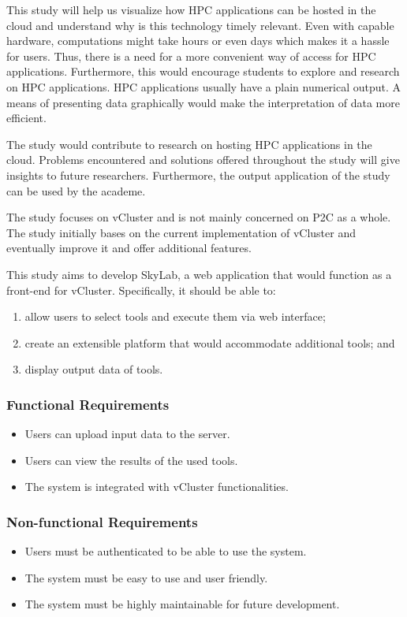     This study will help us visualize how HPC applications can be hosted in the cloud and understand why is this technology timely relevant.  Even with capable hardware, computations might take hours or even days which makes it a hassle for users. Thus, there is a need for a more convenient way of access for HPC applications. Furthermore, this would encourage students to explore and research on HPC applications. HPC applications usually have a plain numerical output. A means of presenting data graphically would make the interpretation of data more efficient.

    The study would contribute to research on hosting HPC applications in the cloud. Problems encountered and solutions offered throughout the study will give insights to future researchers. Furthermore, the output application of the study can be used by the academe.

    The study focuses on vCluster and is not mainly concerned on P2C as a whole. The study initially bases on the current implementation of vCluster and eventually improve it and offer additional features\cite {Hermocilla2014}.

    This study aims to develop SkyLab, a web application that would function as a front-end for vCluster. %
	Specifically, it should be able to: 
	\begin{enumerate}
		\item allow users to select tools and execute them via web interface; 
        \item create an extensible platform that would accommodate additional tools; and
		\item display output data of tools.
	\end{enumerate}

		\subsubsection*{Functional Requirements}
		\begin{itemize}
			\item Users can upload input data to the server.
          	\item Users can view the results of the used tools.
          	\item The system is integrated with vCluster functionalities.
        \end{itemize}

		\subsubsection*{Non-functional Requirements}
        \begin{itemize}
          \item Users must be authenticated to be able to use the system.
          \item The system must be easy to use and user friendly.
          \item The system must be highly maintainable for future development.  
        \end{itemize}
        

